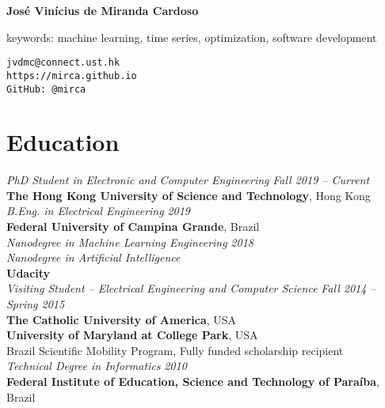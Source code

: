 \documentclass[10pt]{article}
\begin{document}
\pagestyle{empty}
\begin{titlepage}
     {\Large{\textbf{Jos\'e Vin\'icius de Miranda Cardoso}}}
     \vspace{.5cm}

    \begin{minipage}[b]{8cm}
      keywords: machine learning, time series, optimization, software development\\
    \end{minipage}
    \hfill
    \begin{minipage}[b]{4cm}
        \hfill \texttt{jvdmc@connect.ust.hk}\\
        \texttt{https://mirca.github.io}\\
        \texttt{GitHub: @mirca}
    \end{minipage}


\section*{Education}

\emph{PhD Student in Electronic and Computer Engineering} \hfill \textit{Fall 2019 -- Current} \\
\textbf{The Hong Kong University of Science and Technology}, Hong Kong\\

\emph{B.Eng. in Electrical Engineering} \hfill \textit{2019} \\
\textbf{Federal University of Campina Grande}, Brazil\\

\emph{Nanodegree in Machine Learning Engineering} \hfill \textit{2018}\\
\emph{Nanodegree in Artificial Intelligence}\\
\textbf{Udacity}\\

\emph{Visiting Student -- Electrical Engineering and Computer Science} \hfill \textit{Fall 2014 -- Spring 2015} \\
\textbf{The Catholic University of America}, USA\\
\textbf{University of Maryland at College Park}, USA \\
Brazil Scientific Mobility Program, Fully funded scholarship recipient \\

\emph{Technical Degree in Informatics} \hfill \textit{2010}\\
\textbf{Federal Institute of Education, Science and Technology of Para\'iba}, Brazil \\


\end{titlepage}
\end{document}
